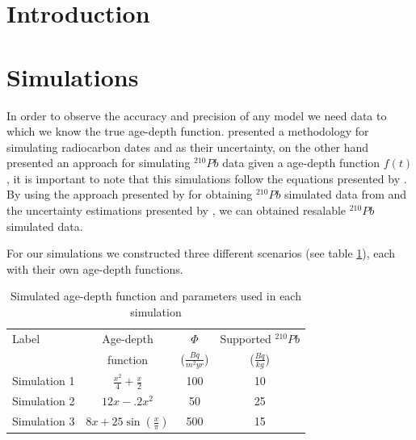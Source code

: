 \documentclass [11pt] {article}
\begin{document}
\section{Introduction}



\section{Simulations}
	In order to observe the accuracy and precision of any model we need data to which we know the true age-depth function. \citet{Blaauw2018} presented a methodology for simulating radiocarbon dates and as their uncertainty, on the other hand \citet{Aquino2018} presented an approach for simulating $^{210}Pb$ data given a age-depth function $f(t)$, it is important to note that this simulations follow the equations presented by \citet*{Appleby1978,Robbins1978}. By using the approach presented by \citet{Aquino2018} for obtaining $^{210}Pb$ simulated data from and the uncertainty estimations presented by \citet{Blaauw2018}, we can obtained resalable $^{210}Pb$ simulated data.

For our simulations we constructed three different scenarios (see table \ref{Tab:sim_param}), each with their own age-depth functions.

\begin{table}[!h]
		\centering
	\begin{tabular}{l|ccc}
Label    	& 	Age-depth		&	$ \Phi$		& Supported $^{210}Pb$  \\
		&	function		&	($\frac{Bq}{m^2yr }$)	& ($\frac{Bq}{kg}$) 	\\ \hline
Simulation 1 	&	$\frac{x^2}{4} + \frac{x}{2}$	&	100	& 10	\\
Simulation 2 	&	$12x -.2x^2$			&	50	& 25	\\
Simulation 3 	&	$8x+25\sin(\frac{x}{\pi})$	&	500 	& 15		
		\end{tabular}
	\label{Tab:sim_param}
	\caption{Simulated age-depth function and parameters used in each simulation}
 \end{table}
\end{document}
